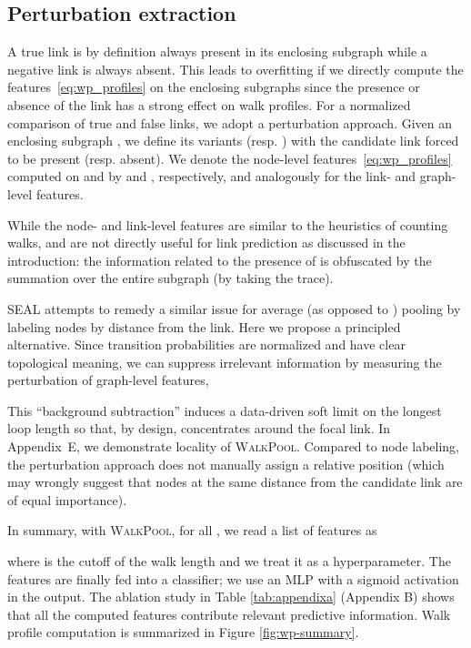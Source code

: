 \documentclass[11pt]{article}
\newcommand{\walkpool}{\textsc{WalkPool}\xspace}
\begin{document}
\subsection{Perturbation extraction}
\vspace{-1mm}
A true link is by definition always present in its enclosing subgraph while a negative link is always absent. This leads to overfitting if we directly compute the features~\eqref{eq:wp_profiles} on the enclosing subgraphs since the presence or absence of the link has a strong effect on walk profiles.
For a normalized comparison of true and false links, we adopt a perturbation approach. Given an enclosing subgraph , we define its variants  (resp. ) with the candidate link forced to be present (resp. absent). We denote the node-level features~\eqref{eq:wp_profiles} computed on   and  by  and , respectively, and analogously for the link- and graph-level features.

While the node- and link-level features are similar to the heuristics of counting walks,  and  are not directly useful for link prediction as discussed in the introduction: the information related to the presence of  is obfuscated by the summation over the entire subgraph (by taking the trace). 



SEAL attempts to remedy a similar issue for average (as opposed to ) pooling by labeling nodes by distance from the link. Here we propose a principled alternative. Since transition probabilities are normalized and have clear topological meaning, we can suppress irrelevant information by measuring the perturbation of graph-level features,

This ``background subtraction'' induces a data-driven soft limit on the longest loop length so that, by design,   concentrates around the focal link. In Appendix~E, we demonstrate locality of \walkpool. Compared to node labeling, the perturbation approach does not manually assign a relative position (which may wrongly suggest that nodes at the same distance from the candidate link are of equal importance).

In summary, with \walkpool, for all , we read a list of features as

where  is the cutoff of the walk length and we treat it as a hyperparameter. The features are finally fed into a classifier; we use an MLP  with a sigmoid activation in the output. The ablation study in Table \ref{tab:appendixa} (Appendix B) shows that all the computed features contribute relevant predictive information. Walk profile computation is summarized in Figure \ref{fig:wp-summary}.
\vspace{-1mm}
\end{document}
